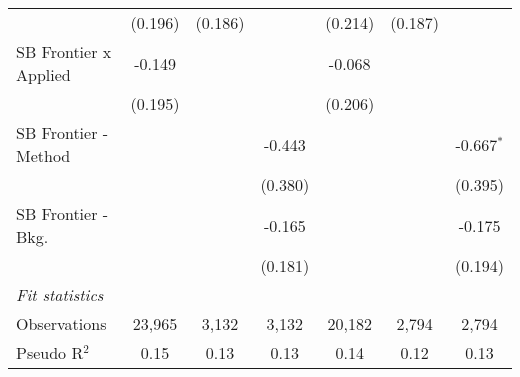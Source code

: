 \begin{tabular}{lcccccc}
                                  & (0.196)        & (0.186)        &                & (0.214)        & (0.187)        &   \\   
   SB Frontier x Applied          & -0.149         &                &                & -0.068         &                &   \\   
                                  & (0.195)        &                &                & (0.206)        &                &   \\   
   SB Frontier - Method           &                &                & -0.443         &                &                & -0.667$^{*}$\\   
                                  &                &                & (0.380)        &                &                & (0.395)\\   
   SB Frontier - Bkg.             &                &                & -0.165         &                &                & -0.175\\   
                                  &                &                & (0.181)        &                &                & (0.194)\\   
   \midrule
   \emph{Fit statistics}\\
   Observations                   & 23,965         & 3,132          & 3,132          & 20,182         & 2,794          & 2,794\\  
   Pseudo R$^2$                   & 0.15           & 0.13           & 0.13           & 0.14           & 0.12           & 0.13\\  
   

\end{tabular}
